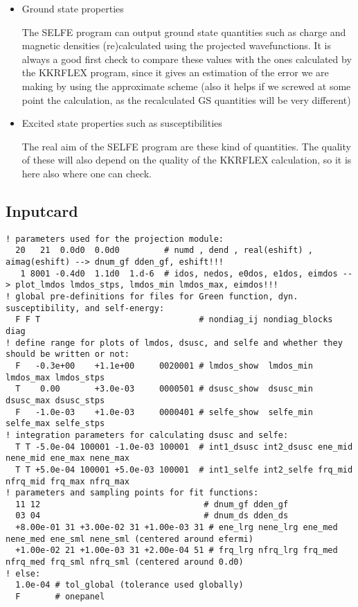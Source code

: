 \documentclass[a4paper,10pt,fullpage]{report}
\begin{document}
\begin{itemize}
\item  Ground state properties

The SELFE program can output ground state quantities such as charge and magnetic densities
(re)calculated using the projected wavefunctions. It is always a good first check to 
compare these values with the ones calculated by the KKRFLEX program, since it gives
an estimation of the error we are making by using the approximate scheme (also it helps
if we screwed at some point the calculation, as the recalculated 
GS quantities will be very different)

\item Excited state properties such as susceptibilities

The real aim of the SELFE program are these kind of quantities. The quality of
these will also depend on the quality of the KKRFLEX calculation, so it is here
also where one can check.

\end{itemize}


\subsection{Inputcard}

{
\footnotesize
\begin{verbatim}
! parameters used for the projection module:
  20   21  0.0d0  0.0d0         # numd , dend , real(eshift) , aimag(eshift) --> dnum_gf dden_gf, eshift!!!
   1 8001 -0.4d0  1.1d0  1.d-6  # idos, nedos, e0dos, e1dos, eimdos --> plot_lmdos lmdos_stps, lmdos_min lmdos_max, eimdos!!!
! global pre-definitions for files for Green function, dyn. susceptibility, and self-energy:
  F F T                                # nondiag_ij nondiag_blocks diag
! define range for plots of lmdos, dsusc, and selfe and whether they should be written or not:
  F   -0.3e+00    +1.1e+00     0020001 # lmdos_show  lmdos_min lmdos_max lmdos_stps
  T    0.00       +3.0e-03     0000501 # dsusc_show  dsusc_min dsusc_max dsusc_stps
  F   -1.0e-03    +1.0e-03     0000401 # selfe_show  selfe_min selfe_max selfe_stps
! integration parameters for calculating dsusc and selfe:
  T T -5.0e-04 100001 -1.0e-03 100001  # int1_dsusc int2_dsusc ene_mid nene_mid ene_max nene_max
  T T +5.0e-04 100001 +5.0e-03 100001  # int1_selfe int2_selfe frq_mid nfrq_mid frq_max nfrq_max
! parameters and sampling points for fit functions:
  11 12                                 # dnum_gf dden_gf
  03 04                                 # dnum_ds dden_ds
  +8.00e-01 31 +3.00e-02 31 +1.00e-03 31 # ene_lrg nene_lrg ene_med nene_med ene_sml nene_sml (centered around efermi)
  +1.00e-02 21 +1.00e-03 31 +2.00e-04 51 # frq_lrg nfrq_lrg frq_med nfrq_med frq_sml nfrq_sml (centered around 0.d0)
! else:
  1.0e-04 # tol_global (tolerance used globally)
  F       # onepanel
\end{verbatim}
}
\end{document}
